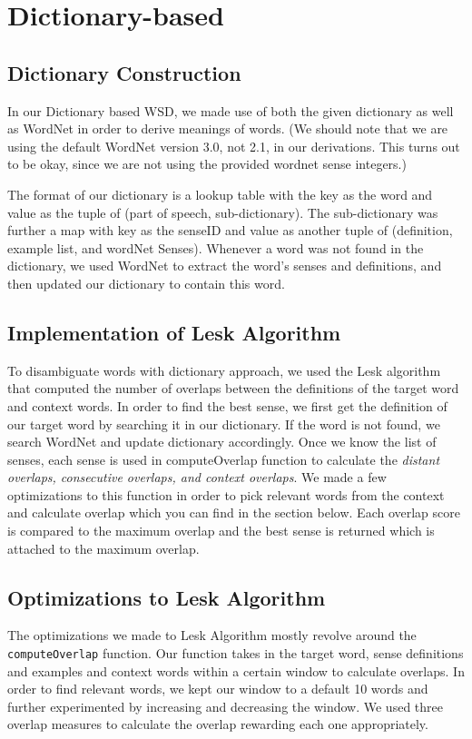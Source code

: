 \documentclass{article}
\begin{document}
\section{Dictionary-based}

\subsection{Dictionary Construction}
In our Dictionary based WSD, we made use of both the given dictionary as well as WordNet in order to derive meanings of words. (We should note that we are using the default WordNet version 3.0, not 2.1, in our derivations. This turns out to be okay, since we are not using the provided wordnet sense integers.)

The format of our dictionary is a lookup table with the key as the word and value as the tuple of (part of speech, sub-dictionary). The sub-dictionary was further a map with key as the senseID and value as another tuple of (definition, example list, and wordNet Senses). Whenever a word was not found in the dictionary, we used WordNet to extract the word's senses and definitions, and then updated our dictionary to contain this word.

\subsection{Implementation of Lesk Algorithm}
To disambiguate words with dictionary approach, we used the Lesk algorithm that computed the number of overlaps between the definitions of the target word and context words. In order to find the best sense, we first get the definition of our target word by searching it in our dictionary. If the word is not found, we search WordNet and update dictionary accordingly. Once we know the list of senses, each sense is used in computeOverlap function to calculate the \emph{distant overlaps, consecutive overlaps, and context overlaps}. We made a few optimizations to this function in order to pick relevant words from the context and calculate overlap which you can find in the section below. Each overlap score is compared to the maximum overlap and the best sense is returned which is attached to the maximum overlap.

\subsection{Optimizations to Lesk Algorithm}
The optimizations we made to Lesk Algorithm mostly revolve around the \texttt{computeOverlap} function. Our function takes in the target word, sense definitions and examples and context words within a certain window to calculate overlaps. In order to find relevant words, we kept our window to a default 10 words and further experimented by increasing and decreasing the window. We used three overlap measures to calculate the overlap rewarding each one appropriately.
\end{document}
